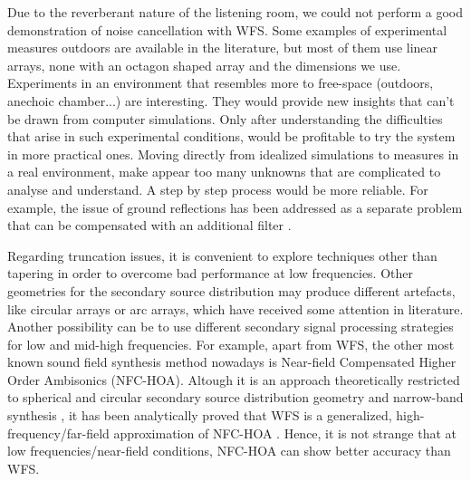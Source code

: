 Due to the reverberant nature of the listening room, we could not perform a good demonstration of noise cancellation with WFS. Some examples of experimental measures outdoors are available in the literature, but most of them use linear arrays, none with an octagon shaped array and the dimensions we use. Experiments in an environment that resembles more to free-space (outdoors, anechoic chamber...) are interesting. They would provide new insights that can't be drawn from computer simulations. Only after understanding the difficulties that arise in such experimental conditions, would be profitable to try the system in more practical ones. Moving directly from idealized simulations to measures in a real environment, make appear too many unknowns that are complicated to analyse and understand. A step by step process would be more reliable. For example, the issue of ground reflections has been addressed as a separate problem that can be compensated with an additional filter \cite{Lapini2018}.

Regarding truncation issues, it is convenient to explore techniques other than tapering in order to overcome bad performance at low frequencies. Other geometries for the secondary source distribution may produce different artefacts, like circular arrays or arc arrays, which have received some attention in literature. Another possibility can be to use different secondary signal processing strategies for low and mid-high frequencies. For example, apart from WFS, the other most known sound field synthesis method nowadays is Near-field Compensated Higher Order Ambisonics (NFC-HOA). Altough it is an approach theoretically restricted to spherical and circular secondary source distribution geometry and narrow-band synthesis \cite{Ahrens2012}, it 
has been analytically proved that WFS is a generalized, high-frequency/far-field approximation of NFC-HOA \cite{FrankSchutz2015}. Hence, it is not strange that at low frequencies/near-field conditions, NFC-HOA can show better accuracy than WFS.